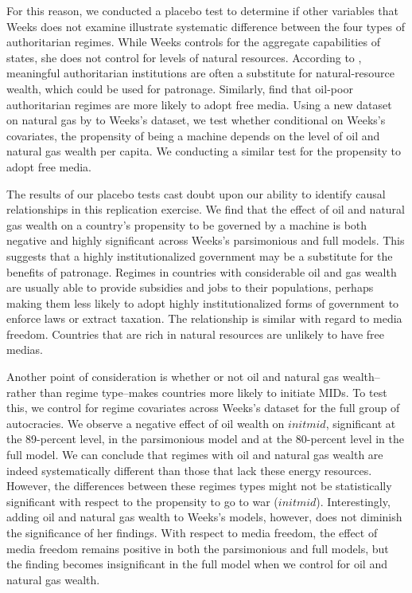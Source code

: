 \documentclass[12pt]{article}
\begin{document}
\par For this reason, we conducted a placebo test to determine if other variables that Weeks does not examine illustrate systematic difference between the four types of authoritarian regimes. While Weeks controls for the aggregate capabilities of states, she does not control for levels of natural resources. According to \cite{smith:2005}, meaningful authoritarian institutions are often a substitute for natural-resource wealth, which could be used for patronage. Similarly, \textcite*{egorov:2009} find that oil-poor authoritarian regimes are more likely to adopt free media. Using a new dataset on natural gas by \parencite*{ross:2015} to Weeks's dataset, we test whether conditional on Weeks's covariates, the propensity of being a machine depends on the level of oil and natural gas wealth per capita. We conducting a similar test for the propensity to adopt free media.  

\par The results of our placebo tests cast doubt upon our ability to identify causal relationships in this replication exercise. We find that the effect of oil and natural gas wealth on a country's propensity to be governed by a machine is both negative and highly significant across Weeks's parsimonious and full models. This suggests that a highly institutionalized government may be a substitute for the benefits of patronage. Regimes in countries with considerable oil and gas wealth are usually able to provide subsidies and jobs to their populations, perhaps making them less likely to adopt highly institutionalized forms of government to enforce laws or extract taxation. The relationship is similar with regard to media freedom. Countries that are rich in natural resources are unlikely to have free medias. 

\par Another point of consideration is whether or not oil and natural gas wealth--rather than regime type--makes countries more likely to initiate MIDs. To test this, we control for regime covariates across Weeks's dataset for the full group of autocracies. We observe a negative effect of oil wealth on $initmid$, significant at the 89-percent level, in the parsimonious model and at the 80-percent level in the full model. We can conclude that regimes with oil and natural gas wealth are indeed systematically different than those that lack these energy resources. However, the differences between these regimes types might not be statistically significant with respect to the propensity to go to war ($initmid$). Interestingly, adding oil and natural gas wealth to Weeks's models, however, does not diminish the significance of her findings. With respect to media freedom, the effect of media freedom remains positive in both the parsimonious and full models, but the finding becomes insignificant in the full model when we control for oil and natural gas wealth. 
\end{document}
